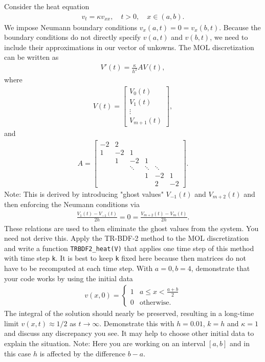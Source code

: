 \documentclass[12pt]{report}
\begin{document}
\begin{problem}
    Consider the heat equation
\begin{align*}
    v_t = \kappa v_{xx}, \quad t > 0,\quad x \in (a,b).
\end{align*}
We impose Neumann boundary conditions $v_x(a,t) = 0 = v_x(b,t)$.  Because the boundary conditions do not directly specify $v(a,t)$ and $v(b,t)$, we need to include their approximations in our vector of unkowns.  The MOL discretization can be written as
\begin{align*}
V'(t) = \frac{\kappa}{h^2} A V(t),
\end{align*}
where
\begin{align*}
V(t) = \begin{bmatrix} V_0(t)\\ V_1(t) \\ \vdots \\ V_{m+1}(t) \end{bmatrix},
\end{align*}
and 
\begin{align*}
A = \begin{bmatrix}
-2  & 2\\
1 & -2 & 1 \\
& 1 & -2 & 1\\
&& \ddots & \ddots & \ddots \\
&&& 1 & -2 & 1\\
&&&& 2 & -2 \end{bmatrix}.
\end{align*}
Note:  This is derived by introducing "ghost values" $V_{-1}(t)$ and $V_{m+2}(t)$ and then enforcing the Neumann conditions via
\begin{align*}
    \frac{V_{1}(t) - V_{-1}(t)}{2h} = 0 = \frac{V_{m+2}(t) - V_{m}(t)}{2h}.
\end{align*}
These relations are used to then eliminate the ghost values from the system.  You need not derive this.  
Apply the TR-BDF-2 method to the MOL discretization and write a function \verb`TRBDF2_heat(V)` that applies one time step of this method with time step \verb`k`.  It is best to keep \verb`k` fixed here because then matrices do not have to be recomputed at each time step.  With $a = 0, b = 4$, demonstrate that your code works by using the initial data
\begin{align*}
    v(x,0) = \begin{cases} 1 &a \leq x < \frac{a+b}{2} \\
    0 & \text{otherwise}.
    \end{cases}
\end{align*}
The integral of the solution should nearly be preserved, resulting in a long-time limit $v(x,t) \approx 1/2$ as $t \to \infty$.  Demonstrate this with $h = 0.01$, $k = h$ and $\kappa = 1$ and discuss any discrepancy you see.  It may help to choose other initial data to explain the situation.
Note: Here you are working on an interval $[a,b]$ and in this case $h$ is affected by the difference $b -a$.
\end{problem}
\end{document}
